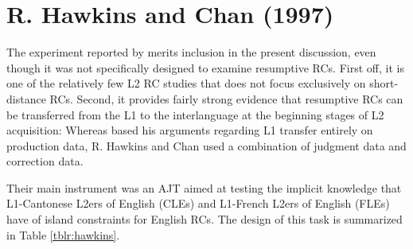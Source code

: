 \section{R. Hawkins and Chan (1997)}\label{acq-hawkins}

The experiment reported by \textcite{hawkins.chan1997} merits inclusion in the present discussion, even though it was not specifically designed to examine resumptive RCs. First off, it is one of the relatively few L2 RC studies that does not focus exclusively on short-distance RCs. Second, it provides fairly strong evidence that resumptive RCs can be transferred from the L1 to the interlanguage at the beginning stages of L2 acquisition: Whereas \textcite{hyltenstam1984,hyltenstam1990} based his arguments regarding L1 transfer entirely on production data, R. Hawkins and Chan used a combination of judgment data and correction data.

Their main instrument was an AJT aimed at testing the implicit knowledge that L1-Cantonese L2ers of English (CLEs) and L1-French L2ers of English (FLEs) have of island constraints for English RCs. The design of this task is summarized in Table \ref{tblr:hawkins}.

